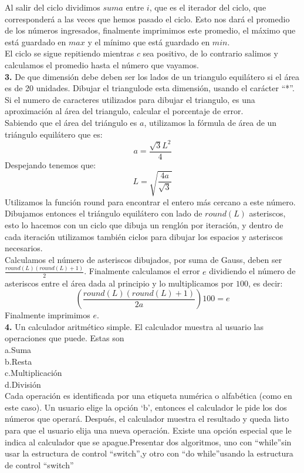 \documentclass{article}
\begin{document}
Al salir del ciclo dividimos $suma$ entre $i$, que es el iterador del ciclo, que corresponderá a las veces que hemos pasado el ciclo. Esto nos dará el promedio de los números ingresados, finalmente imprimimos este promedio, el máximo que está guardado en $max$ y el mínimo que está guardado en $min$.\\ 

El ciclo se sigue repitiendo mientras $c$ sea positivo, de lo contrario salimos y calculamos el promedio hasta el número que vayamos.\\

\textbf{3.} De que dimensión debe deben ser los lados de un triangulo equilátero si el área es de 20 unidades. Dibujar el triangulode esta dimensión, usando el carácter “*”. Si el numero de caracteres utilizados para dibujar el triangulo, es una aproximación al área del triangulo, calcular el porcentaje de error.\\

Sabiendo que el área del triángulo es $a$, utilizamos la fórmula de área de un triángulo equilátero que es: \[ a = \frac{\sqrt{3}L^2}{4} \] Despejando tenemos que: \[ L = \sqrt{\frac{4a}{\sqrt{3}}} \] Utilizamos la función round para encontrar el entero más cercano a este número. Dibujamos entonces el triángulo equilátero con lado de $round(L)$ asteriscos, esto lo hacemos con un ciclo que dibuja un renglón por iteración, y dentro de cada iteración utilizamos también ciclos para dibujar los espacios y asteriscos necesarios.\\
Calculamos el número de asteriscos dibujados, por suma de Gauss, deben ser$\frac{round(L)(round(L)+1)}{2}$.  Finalmente calculamos el error $e$ dividiendo el número de asteriscos entre el área dada al principio y lo multiplicamos por $100$, es decir: \[ (\frac{round(L)(round(L)+1)}{2a})100 = e \] Finalmente imprimimos $e$.\\ 



\textbf{4.} Un calculador aritmético simple. El calculador muestra al usuario las operaciones que puede. Estas son\\
a.Suma\\
b.Resta\\
c.Multiplicación\\
d.División\\
Cada operación es identificada por una etiqueta numérica o alfabética (como en este caso). Un usuario elige la opción ‘b’, entonces el calculador le pide los dos números que operará. Después, el calculador muestra el resultado y queda listo para que el usuario elija una nueva operación. Existe una opción especial que le indica al calculador que se apague.Presentar dos algoritmos, uno con “while”sin usar la estructura de control “switch”,y otro con “do while”usando la estructura de control “switch”\\
\end{document}
